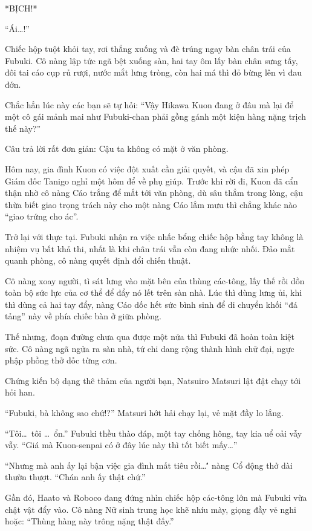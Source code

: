 \documentclass[../main.tex]{subfiles}
\begin{document}
*BỊCH!*

``Ái\dots!''

Chiếc hộp tuột khỏi tay, rơi thẳng xuống và đè trúng ngay bàn chân trái của Fubuki. Cô nàng lập tức ngã bệt xuống sàn, hai tay ôm lấy bàn chân sưng tấy, đôi tai cáo cụp rủ rượi, nước mắt lưng tròng, còn hai má thì đỏ bừng lên vì đau đớn.


\ct

Chắc hẳn lúc này các bạn sẽ tự hỏi: ``Vậy Hikawa Kuon đang ở đâu mà lại để một cô gái mảnh mai như Fubuki-chan phải gồng gánh một kiện hàng nặng trịch thế này?''

Câu trả lời rất đơn giản: Cậu ta không có mặt ở văn phòng.

Hôm nay, gia đình Kuon có việc đột xuất cần giải quyết, và cậu đã xin phép Giám đốc Tanigo nghỉ một hôm để về phụ giúp. Trước khi rời đi, Kuon đã cẩn thận nhờ cô nàng Cáo trắng để mắt tới văn phòng, dù sâu thẳm trong lòng, cậu thừa biết giao trọng trách này cho một nàng Cáo lắm mưu thì chẳng khác nào ``giao trứng cho ác''.

Trở lại với thực tại. Fubuki nhận ra việc nhấc bổng chiếc hộp bằng tay không là nhiệm vụ bất khả thi, nhất là khi chân trái vẫn còn đang nhức nhối. Đảo mắt quanh phòng, cô nàng quyết định đổi chiến thuật.

Cô nàng xoay người, tì sát lưng vào mặt bên của thùng các-tông, lấy thế rồi dồn toàn bộ sức lực của cơ thể để đẩy nó lết trên sàn nhà. Lúc thì dùng lưng ủi, khi thì dùng cả hai tay đẩy, nàng Cáo dốc hết sức bình sinh để di chuyển khối ``đá tảng'' này về phía chiếc bàn ở giữa phòng.


Thế nhưng, đoạn đường chưa qua được một nửa thì Fubuki đã hoàn toàn kiệt sức. Cô nàng ngã ngửa ra sàn nhà, tứ chi dang rộng thành hình chữ đại, ngực phập phồng thở dốc từng cơn.

Chứng kiến bộ dạng thê thảm của người bạn, Natsuiro Matsuri lật đật chạy tới hỏi han.

``Fubuki, bà không sao chứ!?'' Matsuri hớt hải chạy lại, vẻ mặt đầy lo lắng.

``Tôi\dots\ tôi \dots\ ổn.'' Fubuki thều thào đáp, một tay chống hông, tay kia uể oải vẫy vẫy. ``Giá mà Kuon-senpai có ở đây lúc này thì tốt biết mấy\dots''

``Nhưng mà anh ấy lại bận việc gia đình mất tiêu rồi\dots\'' nàng Cổ động thở dài thườn thượt. ``Chán anh ấy thật chứ.''

Gần đó, Haato và Roboco đang đứng nhìn chiếc hộp các-tông lớn mà Fubuki vừa chật vật đẩy vào. Cô nàng Nữ sinh trung học khẽ nhíu mày, giọng đầy vẻ nghi hoặc: ``Thùng hàng này trông nặng thật đấy.''
\end{document}
